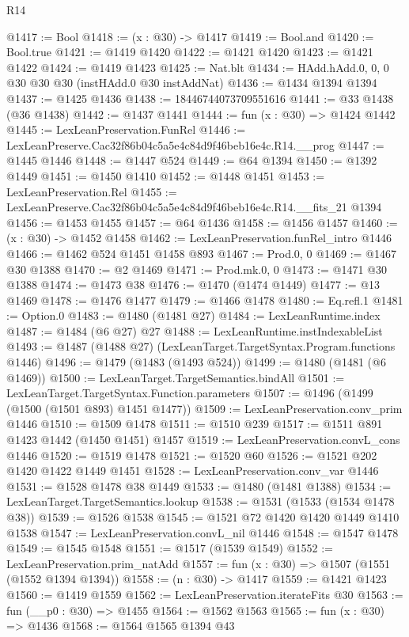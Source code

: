 \begin{lexlean}{R14}
\begin{coremodule}
@1417 := Bool
@1418 := (x : @30) -> @1417
@1419 := Bool.and
@1420 := Bool.true
@1421 := @1419 @1420
@1422 := @1421 @1420
@1423 := @1421 @1422
@1424 := @1419 @1423
@1425 := Nat.blt
@1434 := HAdd.hAdd.{0, 0, 0} @30 @30 @30 (instHAdd.{0} @30 instAddNat)
@1436 := @1434 @1394 @1394
@1437 := @1425 @1436
@1438 := 18446744073709551616
@1441 := @33 @1438 (@36 @1438)
@1442 := @1437 @1441
@1444 := fun (x : @30) => @1424 @1442
@1445 := LexLeanPreservation.FunRel
@1446 := LexLeanPreserve.Cac32f86b04c5a5e4c84d9f46beb16e4c.R14.__prog
@1447 := @1445 @1446
@1448 := @1447 @524
@1449 := @64 @1394
@1450 := @1392 @1449
@1451 := @1450 @1410
@1452 := @1448 @1451
@1453 := LexLeanPreservation.Rel
@1455 := LexLeanPreserve.Cac32f86b04c5a5e4c84d9f46beb16e4c.R14.__fits_21 @1394
@1456 := @1453 @1455
@1457 := @64 @1436
@1458 := @1456 @1457
@1460 := (x : @30) -> @1452 @1458
@1462 := LexLeanPreservation.funRel_intro @1446
@1466 := @1462 @524 @1451 @1458 @893
@1467 := Prod.{0, 0}
@1469 := @1467 @30 @1388
@1470 := @2 @1469
@1471 := Prod.mk.{0, 0}
@1473 := @1471 @30 @1388
@1474 := @1473 @38
@1476 := @1470 (@1474 @1449)
@1477 := @13 @1469
@1478 := @1476 @1477
@1479 := @1466 @1478
@1480 := Eq.refl.{1}
@1481 := Option.{0}
@1483 := @1480 (@1481 @27)
@1484 := LexLeanRuntime.index
@1487 := @1484 (@6 @27) @27
@1488 := LexLeanRuntime.instIndexableList
@1493 := @1487 (@1488 @27) (LexLeanTarget.TargetSyntax.Program.functions @1446)
@1496 := @1479 (@1483 (@1493 @524))
@1499 := @1480 (@1481 (@6 @1469))
@1500 := LexLeanTarget.TargetSemantics.bindAll
@1501 := LexLeanTarget.TargetSyntax.Function.parameters
@1507 := @1496 (@1499 (@1500 (@1501 @893) @1451 @1477))
@1509 := LexLeanPreservation.conv_prim @1446
@1510 := @1509 @1478
@1511 := @1510 @239
@1517 := @1511 @891 @1423 @1442 (@1450 @1451) @1457
@1519 := LexLeanPreservation.convL_cons @1446
@1520 := @1519 @1478
@1521 := @1520 @60
@1526 := @1521 @202 @1420 @1422 @1449 @1451
@1528 := LexLeanPreservation.conv_var @1446
@1531 := @1528 @1478 @38 @1449
@1533 := @1480 (@1481 @1388)
@1534 := LexLeanTarget.TargetSemantics.lookup
@1538 := @1531 (@1533 (@1534 @1478 @38))
@1539 := @1526 @1538
@1545 := @1521 @72 @1420 @1420 @1449 @1410 @1538
@1547 := LexLeanPreservation.convL_nil @1446
@1548 := @1547 @1478
@1549 := @1545 @1548
@1551 := @1517 (@1539 @1549)
@1552 := LexLeanPreservation.prim_natAdd
@1557 := fun (x : @30) => @1507 (@1551 (@1552 @1394 @1394))
@1558 := (n : @30) -> @1417
@1559 := @1421 @1423
@1560 := @1419 @1559
@1562 := LexLeanPreservation.iterateFits @30
@1563 := fun (__p0 : @30) => @1455
@1564 := @1562 @1563
@1565 := fun (x : @30) => @1436
@1568 := @1564 @1565 @1394 @43

\end{coremodule}
\end{lexlean}
